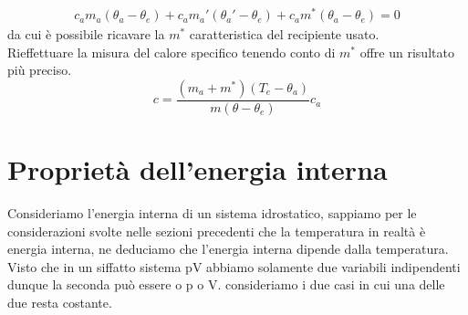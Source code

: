 \documentclass[
10pt, %
a4paper, %
oneside, %
headinclude,footinclude, %
BCOR5mm, %
]{scrartcl}
\begin{document}
\begin{align*} 
	c_a m_a (\theta_a-\theta_e)+c_a m_a'(\theta_a'-\theta_e)+c_a m^*(\theta_a-\theta_e) = 0
\end{align*} 
da cui è possibile ricavare la \(m^*\) caratteristica del recipiente usato.\\
Rieffettuare la misura del calore specifico tenendo conto di \(m^*\) offre un risultato più preciso. 
\[c = \frac{(m_{a}+ m^*)(T_e - \theta_{a})}{m(\theta - \theta_e)}c_{a}\]
\newpage
\section{Proprietà dell'energia interna}
Consideriamo l'energia interna di un sistema idrostatico, sappiamo per le considerazioni svolte nelle sezioni precedenti che la temperatura in realtà è energia interna, ne deduciamo che l'energia interna dipende dalla temperatura. Visto che in un siffatto sistema pV abbiamo solamente due variabili indipendenti dunque la seconda può essere o p o V. consideriamo i due casi in cui una delle due resta costante.
\end{document}
